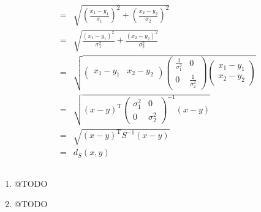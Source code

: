 \documentclass[DIN, pagenumber=false, fontsize=11pt, parskip=half]{scrartcl}
\begin{document}
\begin{enumerate}[label=\alph*)]
\begin{eqnarray*}
                    &=& \sqrt{{\left(\frac{x_1 - y_1}{\sigma_1}\right)}^2 + {\left(\frac{x_2 - y_2}{\sigma_2}\right)}^2} \\
                    &=& \sqrt{\frac{{(x_1 - y_1)}^2}{\sigma_1^2} + \frac{{(x_2 - y_2)}^2}{\sigma_2^2}} \\
                    &=& \sqrt{
                        \begin{pmatrix}x_1 - y_1 & x_2 - y_2 \end{pmatrix} 
                            \begin{pmatrix} \frac{1}{\sigma_1^2} & 0 \\ 0 & \frac{1}{\sigma_2^2} \end{pmatrix} 
                            \begin{pmatrix}x_1 - y_1 \\ x_2 - y_2 \end{pmatrix}}\\
                    &=& \sqrt{{(x-y)}^\text{T}
                            {\begin{pmatrix} \sigma_1^2 & 0 \\ 0 & \sigma_2^2 \end{pmatrix}}^{-1}
                            (x-y)} \\
                    &=& \sqrt{{(x-y)}^\text{T}
                            S^{-1}
                            (x-y)} \\
                    &=& d_S(x,y)
            \end{eqnarray*}
    \end{enumerate}

    \subsection{}
    \begin{enumerate}[label=\alph*)]
        \item @TODO
        \item @TODO
    \end{enumerate}

    \subsection{}
    
\end{document}
